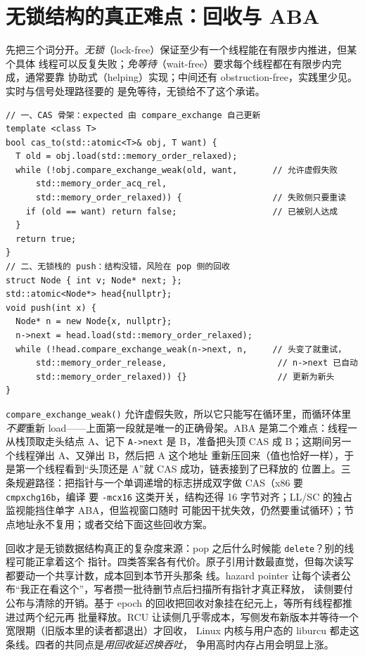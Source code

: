 \documentclass[12pt,a4paper,fontset=fandol]{ctexbook}
\newcommand{\Fn}[1]{\texttt{#1()}}
\newcommand{\Tp}[1]{\texttt{#1}}
\begin{document}
\section{无锁结构的真正难点：回收与 ABA}

先把三个词分开。\emph{无锁}（lock-free）保证至少有一个线程能在有限步内推进，但某个具体
线程可以反复失败；\emph{免等待}（wait-free）要求每个线程都在有限步内完成，通常要靠
协助式（helping）实现；中间还有 obstruction-free，实践里少见。实时与信号处理路径要的
是免等待，无锁给不了这个承诺。
\begin{lstlisting}[style=cppstyle,caption={CAS 循环的正确形态与无锁栈的 ABA 现场}]
// 一、CAS 骨架：expected 由 compare_exchange 自己更新
template <class T>
bool cas_to(std::atomic<T>& obj, T want) {
  T old = obj.load(std::memory_order_relaxed);
  while (!obj.compare_exchange_weak(old, want,       // 允许虚假失败
      std::memory_order_acq_rel,
      std::memory_order_relaxed)) {                  // 失败侧只要重读
    if (old == want) return false;                   // 已被别人达成
  }
  return true;
}
// 二、无锁栈的 push：结构没错，风险在 pop 侧的回收
struct Node { int v; Node* next; };
std::atomic<Node*> head{nullptr};
void push(int x) {
  Node* n = new Node{x, nullptr};
  n->next = head.load(std::memory_order_relaxed);
  while (!head.compare_exchange_weak(n->next, n,     // 头变了就重试，
      std::memory_order_release,                      // n->next 已自动
      std::memory_order_relaxed)) {}                  // 更新为新头
}
\end{lstlisting}

\Fn{compare\_exchange\_weak} 允许虚假失败，所以它只能写在循环里，而循环体里\emph{不要}重新
load——上面第一段就是唯一的正确骨架。ABA 是第二个难点：线程一从栈顶取走头结点 A、记下
\Tp{A->next} 是 B，准备把头顶 CAS 成 B；这期间另一个线程弹出 A、又弹出 B，然后把 A 这个地址
重新压回来（值也恰好一样），于是第一个线程看到``头顶还是 A''就 CAS 成功，链表接到了已释放的
位置上。三条规避路径：把指针与一个单调递增的标志拼成双字做 CAS（x86 要 \Tp{cmpxchg16b}，编译
要 \Tp{-mcx16} 这类开关，结构还得 16 字节对齐；LL/SC 的独占监视能挡住单字 ABA，但监视窗口随时
可能因干扰失效，仍然要重试循环）；节点地址永不复用；或者交给下面这些回收方案。

回收才是无锁数据结构真正的复杂度来源：pop 之后什么时候能 \Tp{delete}？别的线程可能正拿着这个
指针。四类答案各有代价。原子引用计数最直觉，但每次读写都要动一个共享计数，成本回到本节开头那条
线。hazard pointer 让每个读者公布``我正在看这个''，写者攒一批待删节点后扫描所有指针才真正释放，
读侧要付公布与清除的开销。基于 epoch 的回收把回收对象挂在纪元上，等所有线程都推进过两个纪元再
批量释放。RCU 让读侧几乎零成本，写侧发布新版本并等待一个宽限期（旧版本里的读者都退出）才回收，
Linux 内核与用户态的 liburcu 都走这条线。四者的共同点是\emph{用回收延迟换吞吐}，
争用高时内存占用会明显上涨。
\end{document}
